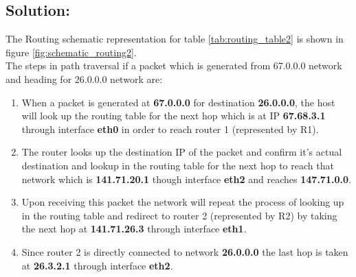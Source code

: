 \documentclass{resources/WeSTassignment}
\begin{document}
\begin{table}[h]
\centering
\caption{Routing Table for \ref{fig:schematic_routing1}}
\label{tab:routing_table1}
\end{table}

\subsection{Solution:}
The Routing schematic representation for table \ref{tab:routing_table2} is shown in figure \ref{fig:schematic_routing2}.\\
The steps in path traversal if a packet which is generated from 67.0.0.0 network and heading for 26.0.0.0 network are:
\begin{enumerate}
	\item When a packet is generated at \textbf{67.0.0.0} for destination \textbf{26.0.0.0}, the host will look up the routing table for the next hop which is at IP \textbf{67.68.3.1} through interface \textbf{eth0} in order to reach router 1 (represented by R1). 
	\item The router looks up the destination IP of the packet and confirm it's actual destination and lookup in the routing table for the next hop to reach that network which is \textbf{141.71.20.1} though interface \textbf{eth2} and reaches \textbf{147.71.0.0}. 
	\item Upon receiving this packet the network will repeat the process of looking up in the routing table and redirect to router 2 (represented by R2) by taking the next hop at \textbf{141.71.26.3} through interface \textbf{eth1}. 
	\item Since router 2 is directly connected to network \textbf{26.0.0.0} the last hop is taken at \textbf{26.3.2.1} through interface  \textbf{eth2}.
\end{enumerate}
\end{document}
